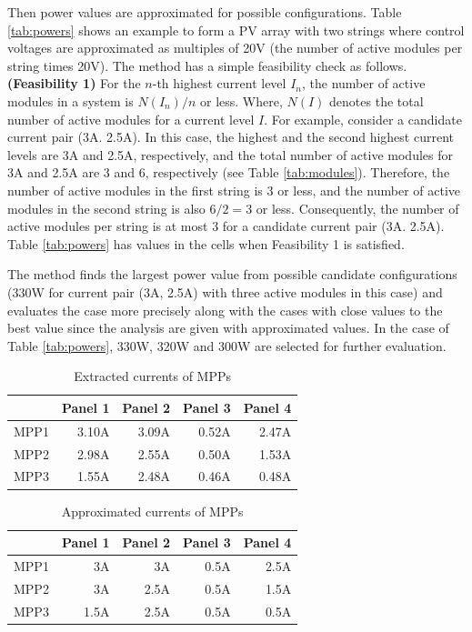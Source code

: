 \documentclass[conference]{IEEEtran}
\begin{document}
Then power values are approximated for possible configurations. Table \ref{tab:powers} shows an example to form a PV array with two strings where control voltages are approximated as multiples of 20V (the number of active modules per string times 20V). The method has a simple feasibility check as follows. \newline{}
\textbf{(Feasibility 1)} For the $n$-th highest current level $I_{n}$, the number of active modules in a system is $N(I_{n}) / n$ or less. \newline{}
Where, $N(I)$ denotes the total number of active modules for a current level $I$. 
For example, consider a candidate current pair (3A. 2.5A). In this case, the highest and the second highest current levels are 3A and 2.5A, respectively, and the total number of active modules for 3A and 2.5A are 3 and 6, respectively (see Table \ref{tab:modules}). Therefore, the number of active modules in the first string is 3 or less, and the number of active modules in the second string is also $ 6/2  = 3$ or less. Consequently, the number of active modules per string is at most 3 for a candidate current pair (3A. 2.5A). Table \ref{tab:powers} has values in the cells when Feasibility 1 is satisfied. 

The method finds the largest power value from possible candidate configurations (330W for current pair (3A, 2.5A) with three active modules in this case) and evaluates the case more precisely along with the cases with close values to the best value since the analysis are given with approximated values. In the case of Table \ref{tab:powers}, 330W, 320W and 300W are selected for further evaluation. 

\begin{table}[t]
\caption{Extracted currents of MPPs}
\label{tab:monitored}
\centering
\begin{tabular}{|c|r|r|r|r|}									\hline
	&	\multicolumn{1}{|c|}{Panel 1}	&	\multicolumn{1}{|c|}{Panel 2}	&	\multicolumn{1}{|c|}{Panel 3}	&	\multicolumn{1}{|c|}{Panel 4}	\\ \hline
MPP1	&	3.10A	&	3.09A	&	0.52A	&	2.47A	\\ \hline
MPP2	&	2.98A	&	2.55A	&	0.50A	&	1.53A	\\ \hline
MPP3	&	1.55A	&	2.48A	&	0.46A	&	0.48A	\\ \hline
\end{tabular}
\end{table}

\begin{table}[t]
\caption{Approximated currents of MPPs}
\label{tab:approximated}
\centering
\begin{tabular}{|c|r|r|r|r|}	
									\hline
	&	\multicolumn{1}{|c|}{Panel 1}	&	\multicolumn{1}{|c|}{Panel 2}	&	\multicolumn{1}{|c|}{Panel 3}	&	\multicolumn{1}{|c|}{Panel 4}	\\ \hline
MPP1	&	3A	&	3A	&	0.5A	&	2.5A	\\ \hline
MPP2	&	3A	&	2.5A	&	0.5A	&	1.5A	\\ \hline
MPP3	&	1.5A	&	2.5A	&	0.5A	&	0.5A	\\ \hline
\end{tabular}
\end{table}
\end{document}
